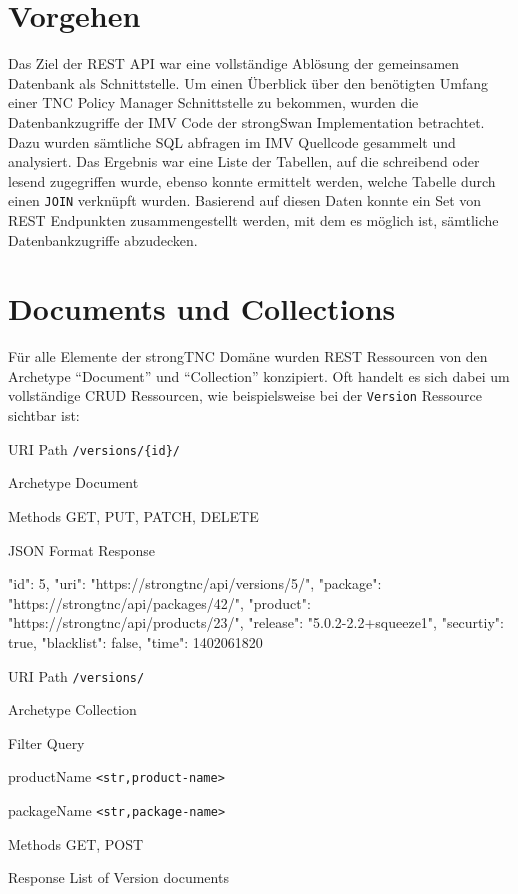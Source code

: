 \section{Vorgehen}
Das Ziel der REST API war eine vollständige Ablösung der gemeinsamen Datenbank
als Schnittstelle. Um einen Überblick über den benötigten Umfang einer TNC
Policy Manager Schnittstelle zu bekommen, wurden die Datenbankzugriffe der IMV
Code der strongSwan Implementation betrachtet. Dazu wurden sämtliche SQL
abfragen im IMV Quellcode gesammelt und analysiert. Das Ergebnis war eine Liste
der Tabellen, auf die schreibend oder lesend zugegriffen wurde, ebenso konnte
ermittelt werden, welche Tabelle durch einen \texttt{JOIN} verknüpft wurden.
Basierend auf diesen Daten konnte ein Set von REST Endpunkten zusammengestellt
werden, mit dem es möglich ist, sämtliche Datenbankzugriffe abzudecken.

\section{Documents und Collections}
Für alle Elemente der strongTNC Domäne wurden REST Ressourcen von den Archetype
\enquote{Document} und \enquote{Collection} konzipiert. Oft handelt es sich
dabei um vollständige CRUD Ressourcen, wie beispielsweise bei der
\texttt{Version} Ressource sichtbar ist:

\begin{mdframed}[style=def]
\begin{description*}
	\item[URI Path] \texttt{/versions/\{id\}/}
	\item[Archetype] Document
	\item[Methods] GET, PUT, PATCH, DELETE
	\item[JSON Format Response] \hfill
\begin{jsoncode}
{
	"id": 5,
	"uri": "https://strongtnc/api/versions/5/",
	"package": "https://strongtnc/api/packages/42/",
	"product": "https://strongtnc/api/products/23/",
	"release": "5.0.2-2.2+squeeze1",
	"securtiy": true,
	"blacklist": false,
	"time": 1402061820
}
\end{jsoncode}
\end{description*}
\end{mdframed}

\begin{mdframed}[style=def]
\begin{description*}
	\item[URI Path] \texttt{/versions/}
	\item[Archetype] Collection
	\item[Filter Query] \hfill
	\begin{description*}
		\item[productName] \texttt{<str,product-name>}
		\item[packageName] \texttt{<str,package-name>}
	\end{description*}
	\item[Methods] GET, POST
	\item[Response] List of Version documents
\end{description*}
\end{mdframed}


